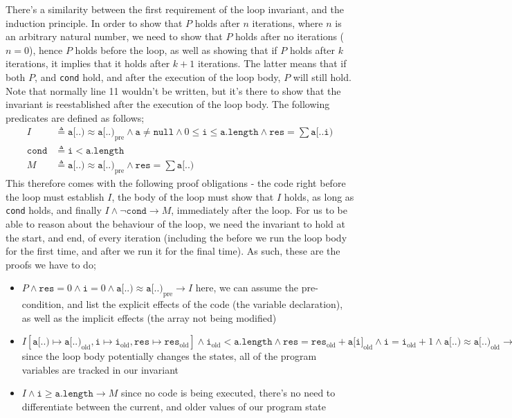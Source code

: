 \documentclass[a4paper, 12pt]{article}
\begin{document}
                There's a similarity between the first requirement of the loop invariant, and the induction principle. In order to show that $P$ holds after $n$ iterations, where $n$ is an arbitrary natural number, we need to show that $P$ holds after no iterations ($n = 0$), hence $P$ holds before the loop, as well as showing that if $P$ holds after $k$ iterations, it implies that it holds after $k + 1$ iterations. The latter means that if both $P$, and \texttt{cond} hold, and after the execution of the loop body, $P$ will still hold. Note that normally line 11 wouldn't be written, but it's there to show that the invariant is reestablished after the execution of the loop body. The following predicates are defined as follows;
                \begin{align*}
                    I & \triangleq \texttt{a[..)} \approx \texttt{a[..)}_\text{pre} \land \texttt{a} \neq \texttt{null} \land 0 \leq \texttt{i} \leq \texttt{a.length} \land \texttt{res} = \sum \texttt{a[..i)} \\
                    \texttt{cond} & \triangleq \texttt{i} < \texttt{a.length} \\
                    M & \triangleq \texttt{a[..)} \approx \texttt{a[..)}_\text{pre} \land \texttt{res} = \sum \texttt{a[..)}
                \end{align*}
                This therefore comes with the following proof obligations - the code right before the loop must establish $I$, the body of the loop must show that $I$ holds, as long as \texttt{cond} holds, and finally $I \land \neg \texttt{cond} \rightarrow M$, immediately after the loop. For us to be able to reason about the behaviour of the loop, we need the invariant to hold at the start, and end, of every iteration (including the before we run the loop body for the first time, and after we run it for the final time). As such, these are the proofs we have to do;
                \begin{itemize}
                    \itemsep0em
                    \item $P \land \texttt{res} = 0 \land \texttt{i} = 0 \land \texttt{a[..)} \approx \texttt{a[..)}_\text{pre} \rightarrow I$
                        \subitem here, we can assume the pre-condition, and list the explicit effects of the code (the variable declaration), as well as the implicit effects (the array not being modified)
                    \item $I[\texttt{a[..)} \mapsto \texttt{a[..)}_\text{old}, \texttt{i} \mapsto \texttt{i}_\text{old}, \texttt{res} \mapsto \texttt{res}_\text{old}] \land \texttt{i}_\text{old} < \texttt{a.length} \land \texttt{res} = \texttt{res}_\text{old} + \texttt{a[i]}_\text{old} \land \texttt{i} = \texttt{i}_\text{old} + 1 \land \texttt{a[..)} \approx \texttt{a[..)}_\text{old} \rightarrow I$
                        \subitem since the loop body potentially changes the states, all of the program variables are tracked in our invariant
                    \item $I \land \texttt{i} \geq \texttt{a.length} \rightarrow M$
                        \subitem since no code is being executed, there's no need to differentiate between the current, and older values of our program state
                \end{itemize}
\end{document}
